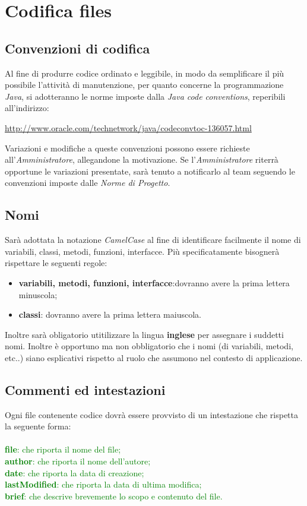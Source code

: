 \section{Codifica files}
\subsection{Convenzioni di codifica}
Al fine di produrre codice ordinato e leggibile, in modo da semplificare il più possibile l'attività di manutenzione, per quanto concerne la programmazione \textit{Java}, si adotteranno le norme imposte dalla \textit{Java code conventions}, reperibili all'indirizzo:
\begin{center}
\href{http://www.oracle.com/technetwork/java/codeconvtoc-136057.html}{http://www.oracle.com/technetwork/java/codeconvtoc-136057.html}
\end{center}
Variazioni e modifiche a queste convenzioni possono essere richieste all'\textit{Amministratore}, allegandone la motivazione.
Se l'\textit{Amministratore} riterrà opportune le variazioni presentate, sarà tenuto a notificarlo al team seguendo le convenzioni imposte dalle \textit{Norme di Progetto}.

\subsection{Nomi}
Sarà adottata la notazione \textit{CamelCase} al fine di identificare facilmente il nome di variabili, classi, metodi, funzioni, interfacce. Più specificatamente bisognerà rispettare le seguenti regole:
\begin{itemize}
\item \textbf{variabili, metodi, funzioni, interfacce}:dovranno avere la prima lettera minuscola;
\item \textbf{classi}: dovranno avere la prima lettera maiuscola.
\end{itemize}
Inoltre sarà obligatorio utitilizzare la lingua \textbf{inglese} per assegnare i suddetti nomi. 
Inoltre è opportuno ma non obbligatorio che i nomi (di variabili, metodi, etc..) siano esplicativi rispetto al ruolo che assumono nel contesto di applicazione.

\subsection{Commenti ed intestazioni}

Ogni file contenente codice dovrà essere provvisto di un intestazione che rispetta la seguente forma:
\\
\\
\textcolor{green}{
\textbf{file}: che riporta il nome del file; \\
\textbf{author}: che riporta il nome dell'autore;\\
\textbf{date}: che riporta la data di creazione; \\
\textbf{lastModified}: che riporta la data di ultima modifica;\\
\textbf{brief}: che descrive brevemente lo scopo e contenuto del file.\\
}

